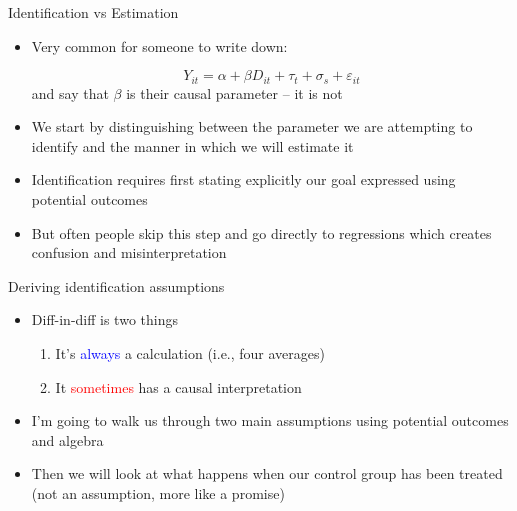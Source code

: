 \documentclass{beamer}
\begin{document}
\begin{frame}{Identification vs Estimation}

\begin{itemize}
\item Very common for someone to write down:

$$ Y_{it} = \alpha + \beta D_{it} + \tau_t + \sigma_s + \varepsilon_{it}$$and say that $\beta$ is their causal parameter -- it is not

\item We start by distinguishing between the parameter we are attempting to identify and the manner in which we will estimate it
\item Identification requires first stating explicitly our goal expressed using potential outcomes
\item But often people skip this step and go directly to regressions which creates confusion and misinterpretation

\end{itemize}

\end{frame}





\begin{frame}{Deriving identification assumptions}

\begin{itemize}

\item Diff-in-diff is two things
	\begin{enumerate}
	\item It's \textcolor{blue}{always} a calculation (i.e., four averages)
	\item It \textcolor{red}{sometimes} has a causal interpretation
	\end{enumerate}
\item I'm going to walk us through two main assumptions using potential outcomes and algebra
\item Then we will look at what happens when our control group has been treated (not an assumption, more like a promise)
\end{itemize}

\end{frame}
\end{document}
